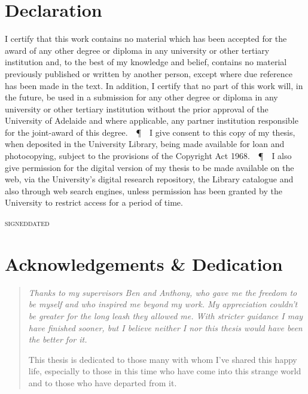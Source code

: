 \documentclass[11pt,a4paper]{memoir}
\begin{document}
\cleardoublepage

\def\PPP{\unskip~\,\textup\P~\,}

\section*{Declaration}

{\centering\begin{minipage}{0.89\textwidth}
\nonfrenchspacing
\parfillskip=0pt
I certify that this work contains no material which has been accepted for the award of any other degree or diploma in any university or other tertiary institution and, to the best of my knowledge and belief, contains no material previously published or written by another person, except where due reference has been made in the text. In addition, I certify that no part of this work will, in the future, be used in a submission for any other degree or diploma in any university or other tertiary institution without the prior approval of the University of Adelaide and where applicable, any partner institution responsible for the joint-award of this degree.
\PPP
I give consent to this copy of my thesis, when deposited in the University Library, being made available for loan and photocopying, subject to the provisions of the Copyright Act 1968.
\PPP
I also give permission for the digital version of my thesis to be made available on the web, via the University’s digital research repository, the Library catalogue and also through web search engines, unless permission has been granted by the University to restrict access for a period of time.
\par

\vspace*{1cm}

\hrulefill\hrulefill\hrulefill\hfill\hrulefill\hrulefill

\noindent\small\textsc{signed}\hfill\textsc{dated}

\end{minipage}\par}


\cleardoublepage

\section*{Acknowledgements \& Dedication}

\begin{quote}
\itshape
Thanks to my supervisors Ben and Anthony, who gave me the freedom to be myself and who inspired me beyond my work.
My appreciation couldn't be greater for the long leash they allowed me.
With stricter guidance I may have finished sooner, but I believe neither I nor this thesis would have been the better for it.

\medskip
\noindent
This thesis is dedicated to those many with whom I've shared this happy life, especially to those in this time who have come into this strange world and to those who have departed from it.
\end{quote}
\end{document}
